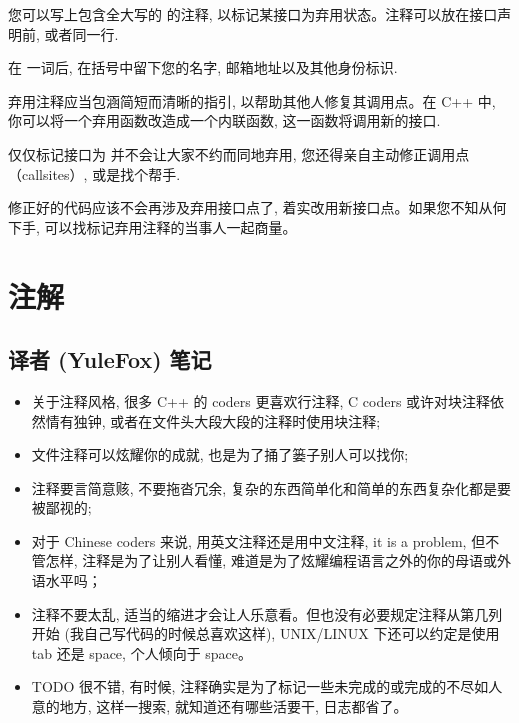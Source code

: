您可以写上包含全大写的  的注释, 以标记某接口为弃用状态。注释可以放在接口声明前, 或者同一行.

在  一词后, 在括号中留下您的名字, 邮箱地址以及其他身份标识.

弃用注释应当包涵简短而清晰的指引, 以帮助其他人修复其调用点。在 C++ 中, 你可以将一个弃用函数改造成一个内联函数, 这一函数将调用新的接口.

仅仅标记接口为  并不会让大家不约而同地弃用, 您还得亲自主动修正调用点（callsites）, 或是找个帮手.

修正好的代码应该不会再涉及弃用接口点了, 着实改用新接口点。如果您不知从何下手, 可以找标记弃用注释的当事人一起商量。

\section{注解}

\subsection{译者 (YuleFox) 笔记}

\begin{itemize}
  \item 关于注释风格, 很多 C++ 的 coders 更喜欢行注释, C coders 或许对块注释依然情有独钟, 或者在文件头大段大段的注释时使用块注释;
  \item 文件注释可以炫耀你的成就, 也是为了捅了篓子别人可以找你;
  \item 注释要言简意赅, 不要拖沓冗余, 复杂的东西简单化和简单的东西复杂化都是要被鄙视的;
  \item 对于 Chinese coders 来说, 用英文注释还是用中文注释, it is a problem, 但不管怎样, 注释是为了让别人看懂, 难道是为了炫耀编程语言之外的你的母语或外语水平吗；
  \item 注释不要太乱, 适当的缩进才会让人乐意看。但也没有必要规定注释从第几列开始 (我自己写代码的时候总喜欢这样), UNIX/LINUX 下还可以约定是使用 tab 还是 space, 个人倾向于 space。
  \item TODO 很不错, 有时候, 注释确实是为了标记一些未完成的或完成的不尽如人意的地方, 这样一搜索, 就知道还有哪些活要干, 日志都省了。
\end{itemize}
